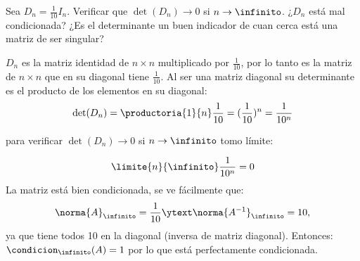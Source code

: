 \begin{enunciado}{\ejercicio}
  Sea $D_n = \frac{1}{10} I_n$. Verificar que $\det(D_n) \to 0$ si $n \to \infinito$. ¿$D_n$ está mal
  condicionada? ¿Es el determinante un buen indicador de cuan cerca está una matriz de ser
  singular?
\end{enunciado}

\medskip

$D_n$ es la matriz identidad de $n \times n$ multiplicado por $\frac{1}{10}$,
por lo tanto es la matriz de $n \times n$
que en su diagonal tiene $\frac{1}{10}$.
Al ser una matriz diagonal su determinante es el producto de los elementos en su diagonal:
$$
  \det(D_n) =
  \productoria{1}{n} \frac{1}{10} =
  (\frac{1}{10})^n=
  \frac{1}{10^n}
$$

para verificar $\det(D_n) \to 0$ si $n \to \infinito$ tomo límite:

$$
  \limite{n}{\infinito}\frac{1}{10^n} = 0
$$
La matriz está bien condicionada, se ve fácilmente que:
$$
  \norma{A}_\infinito = \frac{1}{10} \ytext \norma{A^{-1}}_\infinito = 10,
$$
ya que tiene todos 10 en la diagonal (inversa de matriz diagonal). Entonces: $\condicion_\infinito(A) = 1$ por lo que está perfectamente condicionada.

\begin{aportes}
  \item {}
\end{aportes}
